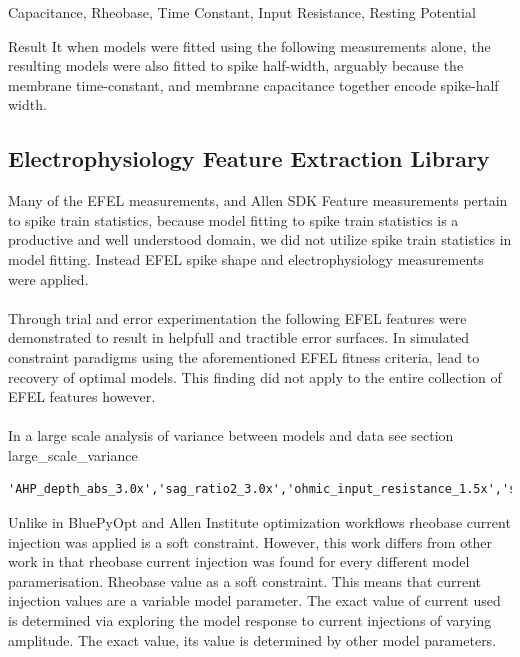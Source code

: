 Capacitance, Rheobase, Time Constant, Input Resistance, Resting Potential

Result It when models were fitted using the following measurements alone, the resulting models were also fitted to spike half-width, arguably because the membrane time-constant, and membrane capacitance together encode spike-half width.

\subsection{Electrophysiology Feature Extraction Library}

Many of the EFEL measurements, and Allen SDK Feature measurements pertain to spike train statistics, because model fitting to spike train statistics is a productive and well understood domain, we did not utilize spike train statistics in model fitting. Instead EFEL spike shape and electrophysiology measurements were applied.\\
\\
Through trial and error experimentation the following EFEL features were demonstrated to result in helpfull and tractible error surfaces. In simulated constraint paradigms using the aforementioned EFEL fitness criteria, lead to recovery of optimal models. This finding did not apply to the entire collection of EFEL features however.\\
\\
In a large scale analysis of variance between models and data see section large\_scale\_variance


\begin{verbatim}
'AHP_depth_abs_3.0x','sag_ratio2_3.0x','ohmic_input_resistance_1.5x','sag_ratio2_1.5x','peak_voltage_3.0x','peak_voltage_1.5x','voltage_base_3.0x','voltage_base_1.5x','Spikecount_1.5x','Spikecount_3.0x','ohmic_input_resistance_vb_ssse_1.5x'
\end{verbatim}


Unlike in BluePyOpt \cite{Werner} and Allen Institute optimization workflows \cite{gouwens} rheobase current injection was applied is a soft constraint. However, this work differs from other work in that rheobase current injection was found for every different model paramerisation.
Rheobase value as a soft constraint. This means that current injection values are a variable model parameter. The exact value of current used is determined via exploring the model response to current injections of varying amplitude. The exact value, its value is determined by other model parameters.


